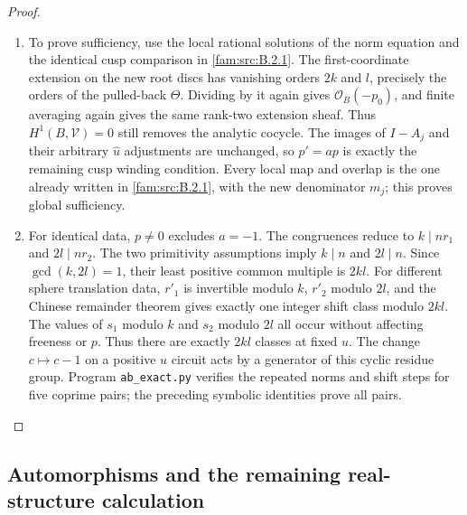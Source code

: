 \begin{proof}
\begin{enumerate}[label=\arabic*.,leftmargin=*]
\item To prove sufficiency, use the local rational solutions of the norm equation and the identical cusp comparison in \ref{fam:src:B.2.1}. The first-coordinate extension on the new root discs has vanishing orders $2k$ and $l$, precisely the orders of the pulled-back $\Theta$. Dividing by it again gives $\mathcal O_B(-p_0)$, and finite averaging again gives the same rank-two extension sheaf. Thus $H^1(B,\mathcal V)=0$ still removes the analytic cocycle. The images of $I-A_j$ and their arbitrary $\widehat u$ adjustments are unchanged, so $p'=ap$ is exactly the remaining cusp winding condition. Every local map and overlap is the one already written in \ref{fam:src:B.2.1}, with the new denominator $m_j$; this proves global sufficiency.

\item For identical data, $p\ne0$ excludes $a=-1$. The congruences reduce to $k\mid nr_1$ and $2l\mid nr_2$. The two primitivity assumptions imply $k\mid n$ and $2l\mid n$. Since $\gcd(k,2l)=1$, their least positive common multiple is $2kl$. For different sphere translation data, $r'_1$ is invertible modulo $k$, $r'_2$ modulo $2l$, and the Chinese remainder theorem gives exactly one integer shift class modulo $2kl$. The values of $s_1$ modulo $k$ and $s_2$ modulo $2l$ all occur without affecting freeness or $p$. Thus there are exactly $2kl$ classes at fixed $u$. The change $c\mapsto c-1$ on a positive $u$ circuit acts by a generator of this cyclic residue group. Program \texttt{ab\_exact.py} verifies the repeated norms and shift steps for five coprime pairs; the preceding symbolic identities prove all pairs.
\end{enumerate}
\end{proof}

\subsection{Automorphisms and the remaining real-structure calculation}\label{fam:section:B.4}

